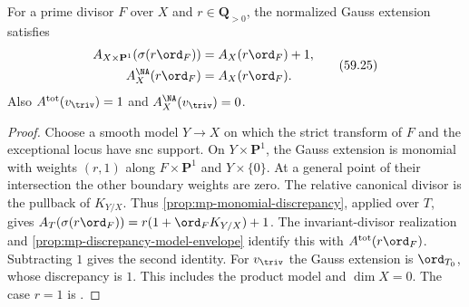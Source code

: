 \begin{proposition}\label{prop:mp-gauss-discrepancy}
For a prime divisor $F$ over $X$ and $r\in\mathbf Q_{>0}$,
the normalized Gauss extension satisfies
\[
 \begin{aligned}
 A_{X\times\mathbf P^1}(\sigma(r\ord_F))
      &=A_X(r\ord_F)+1,\\
 A_X^{\NA}(r\ord_F)&=A_X(r\ord_F).
 \end{aligned}
\tag{59.25}\label{eq:mp-gauss-discrepancy}
\]
Also $A^{\mathrm{tot}}(v_{\triv})=1$ and
$A_X^{\NA}(v_{\triv})=0$.
\end{proposition}

\begin{proof}
Choose a smooth model $Y\to X$ on which the strict transform
of $F$ and the exceptional locus have snc support. On
$Y\times\mathbf P^1$, the Gauss extension is monomial with
weights $(r,1)$ along $F\times\mathbf P^1$ and
$Y\times\{0\}$. At a general point of their intersection
the other boundary weights are zero. The relative canonical
divisor is the pullback of $K_{Y/X}$. Thus
\cref{prop:mp-monomial-discrepancy}, applied over $T$, gives
$A_T(\sigma(r\ord_F))=r(1+\ord_FK_{Y/X})+1$.
The invariant-divisor realization and
\cref{prop:mp-discrepancy-model-envelope} identify this with
$A^{\mathrm{tot}}(r\ord_F)$. Subtracting $1$ gives the second
identity. For $v_{\triv}$ the Gauss extension is $\ord_{T_0}$,
whose discrepancy is $1$. This includes the product model
and $\dim X=0$. The case $r=1$ is
\cite[equation~(3.2.3), p.~32]{MPTropicalV2}.
\end{proof}

